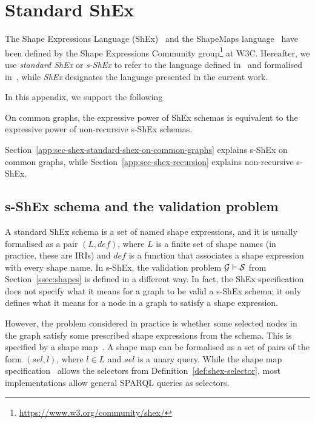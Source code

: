 \section{Standard ShEx}
\label{app:shex-appendix}

\newcommand{\stshex}{s-ShEx\xspace}

The Shape Expressions Language (ShEx)~\cite{PBGK19} and the ShapeMaps
language~\cite{PB19} have been defined by the Shape Expressions Community
group\footnote{\url{https://www.w3.org/community/shex/}} at W3C.
%
%
Hereafter, we use \emph{standard ShEx} or \emph{\stshex} to refer to the
language defined in~\cite{PBGK19} and formalised in~\cite{SBG15,BGP17}, while
\emph{ShEx} designates the language presented in the current work.

In this appendix, we support the following
\begin{claim}
\label{claim:app-shex}
  On common graphs, the expressive power of ShEx schemas is equivalent to the
  expressive power of non-recursive \stshex schemas.
\end{claim}

Section~\ref{app:sec-shex-standard-shex-on-common-graphs} explains \stshex on
common graphs, while Section~\ref{app:sec-shex-recursion} explains non-recursive
\stshex.


\subsection{\stshex schema and the validation problem}

A standard ShEx schema is a set of named shape expressions, and it is usually
formalised as a pair $(L, \mathit{def})$, where $L$ is a finite set of shape
names (in practice, these are IRIs) and $\mathit{def}$ is a function that
associates a shape expression with every shape name.
In \stshex, the validation problem $\mathcal{G} \vDash \mathcal{S}$ from
Section~\ref{ssec:shapes} is defined in a different way.
In fact, the ShEx specification~\cite{PBGK19} does not specify what it means for
a graph to be valid \wrt a \stshex schema; it only defines what it means for a
node in a graph to satisfy a shape expression.

However, the problem considered in practice is whether some selected nodes in
the graph satisfy some prescribed shape expressions from the schema.
This is specified by a shape map~\cite{PB19}.
A shape map can be formalised as a set of pairs of the form $(\mathit{sel},
l)$, where $l \in L$ and $\mathit{sel}$ is a unary query.
While the shape map specification~\cite{PB19} allows the selectors from
Definition~\ref{def:shex-selector}, most implementations allow general SPARQL
queries as selectors.

